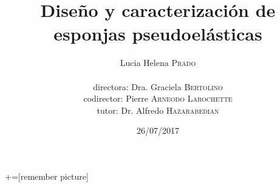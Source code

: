 \documentclass[usenames,dvipsnames]{beamer}
\title[Instituto Sabato]{Diseño y caracterización de esponjas pseudoelásticas}
\author[Prado L.H.]
{
Lucia Helena \textsc{Prado} \\
\\
{\tiny directora:} {\small Dra. Graciela \textsc{Bertolino}}\\
{\tiny codirector:} {\small Pierre \textsc{Arneodo Larochette}}\\
{\tiny tutor:} {\small Dr. Alfredo \textsc{Hazarabedian}} \\
}
\institute{Instituto Sabato 
           \and División Física de Metales - Centro Atómico Bariloche  }
\date{26/07/2017}
\begin{document}
+=[remember picture]

\everymath{\displaystyle}
 
 
  \frame{\titlepage}
%  
% 
% 
%       
% 
% 
%  
% 
%  
% 
% 
% 
% 
%      
\end{document}
